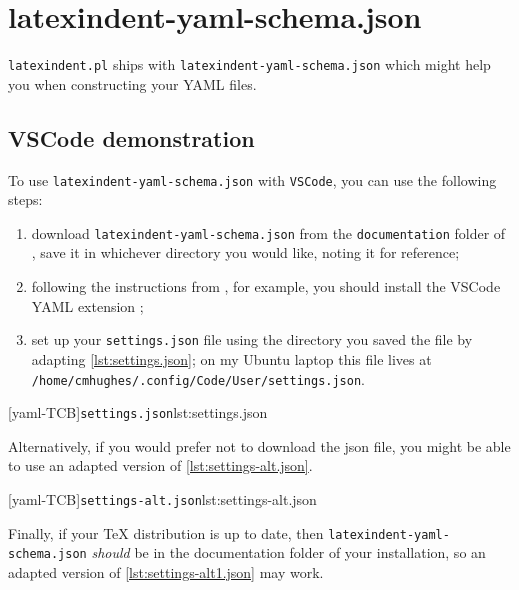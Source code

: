  \section{latexindent-yaml-schema.json}

  \texttt{latexindent.pl}
   ships with
  \texttt{latexindent-yaml-schema.json}
  which might help you when constructing your YAML files.

 \subsection{VSCode demonstration}
  To use \texttt{latexindent-yaml-schema.json} with \texttt{VSCode}, you can use the
  following steps:  
  \begin{enumerate}
   \item download \texttt{latexindent-yaml-schema.json} from the \texttt{documentation} folder of
         \cite{latexindent-home}, save it in whichever directory you would like, noting it for
         reference;
   \item following the instructions from \cite{vscode-yaml-demo}, for example, you should install
         the VSCode YAML extension \cite{vscode-yaml-extentions};
   \item set up your \texttt{settings.json} file using the directory you saved the file by
         adapting \cref{lst:settings.json}; on my Ubuntu laptop this file lives at
         \texttt{/home/cmhughes/.config/Code/User/settings.json}.
  \end{enumerate}

  \begin{widepage}
   [yaml-TCB]{\texttt{settings.json}}{lst:settings.json}
  \end{widepage}

  Alternatively, if you would prefer not to download the json file, you might be able to
  use an adapted version of \cref{lst:settings-alt.json}.

  \begin{widepage}
   [yaml-TCB]{\texttt{settings-alt.json}}{lst:settings-alt.json}
  \end{widepage}

  Finally, if your TeX distribution is up to date, then
  \texttt{latexindent-yaml-schema.json} \emph{should} be in the documentation folder of
  your installation, so an adapted version of \cref{lst:settings-alt1.json} may work.


